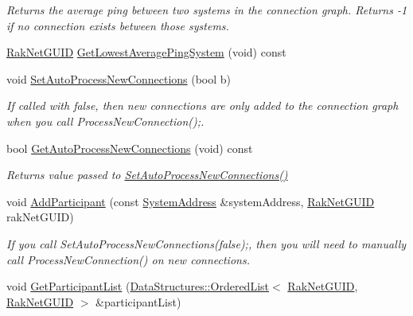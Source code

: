 \begin{DoxyCompactItemize}
\begin{DoxyCompactList}\small\item\em Returns the average ping between two systems in the connection graph. Returns -\/1 if no connection exists between those systems. \end{DoxyCompactList}\item 
\hyperlink{struct_rak_net_1_1_rak_net_g_u_i_d}{Rak\-Net\-G\-U\-I\-D} \hyperlink{class_rak_net_1_1_connection_graph2_a08103e2820bb625f791a8d12c774698f}{Get\-Lowest\-Average\-Ping\-System} (void) const 
\item 
void \hyperlink{class_rak_net_1_1_connection_graph2_ac9dca829641bf0f83ac829409afe4cc5}{Set\-Auto\-Process\-New\-Connections} (bool b)
\begin{DoxyCompactList}\small\item\em If called with false, then new connections are only added to the connection graph when you call Process\-New\-Connection();. \end{DoxyCompactList}\item 
bool \hyperlink{class_rak_net_1_1_connection_graph2_a09f51bf45db6b4fd02a191eff1dec894}{Get\-Auto\-Process\-New\-Connections} (void) const 
\begin{DoxyCompactList}\small\item\em Returns value passed to \hyperlink{class_rak_net_1_1_connection_graph2_ac9dca829641bf0f83ac829409afe4cc5}{Set\-Auto\-Process\-New\-Connections()} \end{DoxyCompactList}\item 
void \hyperlink{class_rak_net_1_1_connection_graph2_a45f7d21038030a9fec3aa7e50f46b8ff}{Add\-Participant} (const \hyperlink{struct_rak_net_1_1_system_address}{System\-Address} \&system\-Address, \hyperlink{struct_rak_net_1_1_rak_net_g_u_i_d}{Rak\-Net\-G\-U\-I\-D} rak\-Net\-G\-U\-I\-D)
\begin{DoxyCompactList}\small\item\em If you call Set\-Auto\-Process\-New\-Connections(false);, then you will need to manually call Process\-New\-Connection() on new connections. \end{DoxyCompactList}\item 
void \hyperlink{class_rak_net_1_1_connection_graph2_a3ab46435da8f6dc2c392d9b47bae7ef7}{Get\-Participant\-List} (\hyperlink{class_data_structures_1_1_ordered_list}{Data\-Structures\-::\-Ordered\-List}$<$ \hyperlink{struct_rak_net_1_1_rak_net_g_u_i_d}{Rak\-Net\-G\-U\-I\-D}, \hyperlink{struct_rak_net_1_1_rak_net_g_u_i_d}{Rak\-Net\-G\-U\-I\-D} $>$ \&participant\-List)
\end{DoxyCompactItemize}
